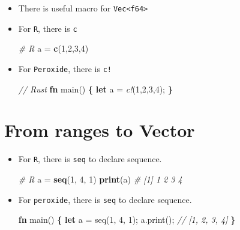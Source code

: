 \documentclass[]{book}
\newenvironment{Shaded}{\begin{snugshade}}{\end{snugshade}}
\newcommand{\CommentTok}[1]{\textcolor[rgb]{0.56,0.35,0.01}{\textit{#1}}}
\newcommand{\DecValTok}[1]{\textcolor[rgb]{0.00,0.00,0.81}{#1}}
\newcommand{\KeywordTok}[1]{\textcolor[rgb]{0.13,0.29,0.53}{\textbf{#1}}}
\newcommand{\NormalTok}[1]{#1}
\newcommand{\OperatorTok}[1]{\textcolor[rgb]{0.81,0.36,0.00}{\textbf{#1}}}
\newcommand{\PreprocessorTok}[1]{\textcolor[rgb]{0.56,0.35,0.01}{\textit{#1}}}
\newcommand{\StringTok}[1]{\textcolor[rgb]{0.31,0.60,0.02}{#1}}
\begin{document}
\begin{itemize}
\item
  There is useful macro for \texttt{Vec\textless{}f64\textgreater{}}
\item
  For \texttt{R}, there is \texttt{c}

\begin{Shaded}
\begin{Highlighting}[]
\CommentTok{# R}
\NormalTok{a =}\StringTok{ }\KeywordTok{c}\NormalTok{(}\DecValTok{1}\NormalTok{,}\DecValTok{2}\NormalTok{,}\DecValTok{3}\NormalTok{,}\DecValTok{4}\NormalTok{)}
\end{Highlighting}
\end{Shaded}
\item
  For \texttt{Peroxide}, there is \texttt{c!}

\begin{Shaded}
\begin{Highlighting}[]
\CommentTok{// Rust}
\KeywordTok{fn}\NormalTok{ main() }\OperatorTok{\{}
    \KeywordTok{let}\NormalTok{ a = }\PreprocessorTok{c!}\NormalTok{(}\DecValTok{1}\NormalTok{,}\DecValTok{2}\NormalTok{,}\DecValTok{3}\NormalTok{,}\DecValTok{4}\NormalTok{);}
\OperatorTok{\}}
\end{Highlighting}
\end{Shaded}
\end{itemize}

\hypertarget{from-ranges-to-vector}{%
\section{From ranges to Vector}\label{from-ranges-to-vector}}

\begin{itemize}
\item
  For \texttt{R}, there is \texttt{seq} to declare sequence.

\begin{Shaded}
\begin{Highlighting}[]
\CommentTok{# R}
\NormalTok{a =}\StringTok{ }\KeywordTok{seq}\NormalTok{(}\DecValTok{1}\NormalTok{, }\DecValTok{4}\NormalTok{, }\DecValTok{1}\NormalTok{)}
\KeywordTok{print}\NormalTok{(a)}
\CommentTok{# [1] 1 2 3 4}
\end{Highlighting}
\end{Shaded}
\item
  For \texttt{peroxide}, there is \texttt{seq} to declare sequence.

\begin{Shaded}
\begin{Highlighting}[]
\KeywordTok{fn}\NormalTok{ main() }\OperatorTok{\{}
    \KeywordTok{let}\NormalTok{ a = seq(}\DecValTok{1}\NormalTok{, }\DecValTok{4}\NormalTok{, }\DecValTok{1}\NormalTok{);}
\NormalTok{    a.print();}
    \CommentTok{// [1, 2, 3, 4]}
\OperatorTok{\}}
\end{Highlighting}
\end{Shaded}
\end{itemize}
\end{document}
